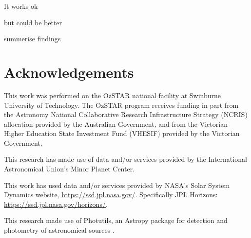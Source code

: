 \documentclass{UCreport}
\begin{document}
It works ok

but could be better

summerise findings

\newpage %

\section*{Acknowledgements}
\small
This work was performed on the OzSTAR national facility at Swinburne University of Technology.
The OzSTAR program receives funding in part from the Astronomy National Collaborative Research Infrastructure Strategy (NCRIS) allocation provided by the Australian Government, and from the Victorian Higher Education State Investment Fund (VHESIF) provided by the Victorian Government.

This research has made use of data and/or services provided by the International Astronomical Union's Minor Planet Center.

This work has used data and/or services provided by NASA's Solar System Dynamics website, \url{https://ssd.jpl.nasa.gov/}. Specifically JPL Horizons: \url{https://ssd.jpl.nasa.gov/horizons/}.

This research made use of Photutils, an Astropy package for detection and photometry of astronomical sources \citep{Bradley2024}.

% 

\end{document}
